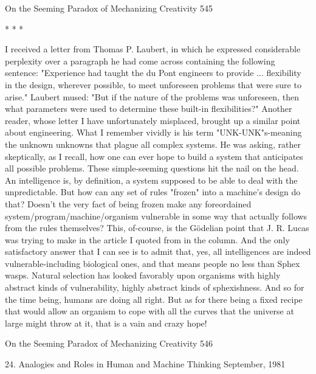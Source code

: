 On the Seeming Paradox of Mechanizing Creativity                                     545

                                       *   *   *

         I received a letter from Thomas P. Laubert, in which he expressed
considerable perplexity over a paragraph he had come across containing the following
sentence: "Experience had taught the du Pont engineers to provide ... flexibility in the
design, wherever possible, to meet unforeseen problems that were sure to arise."
Laubert mused: "But if the nature of the problems was unforeseen, then what
parameters were used to determine these built-in flexibilities?" Another reader, whose
letter I have unfortunately misplaced, brought up a similar point about engineering.
What I remember vividly is his term "UNK-UNK"s-meaning the unknown unknowns
that plague all complex systems. He was asking, rather skeptically, as I recall, how
one can ever hope to build a system that anticipates all possible problems.
         These simple-seeming questions hit the nail on the head. An intelligence is, by
definition, a system supposed to be able to deal with the unpredictable. But how can
any set of rules "frozen" into a machine's design do that? Doesn't the very fact of
being frozen make any foreordained system/program/machine/organism vulnerable in
some way that actually follows from the rules themselves? This, of-course, is the
Gödelian point that J. R. Lucas was trying to make in the article I quoted from in the
column. And the only satisfactory answer that I can see is to admit that, yes, all
intelligences are indeed vulnerable-including biological ones, and that means people
no less than Sphex wasps. Natural selection has looked favorably upon organisms
with highly abstract kinds of vulnerability, highly abstract kinds of sphexishness. And
so for the time being, humans are doing all right. But as for there being a fixed recipe
that would allow an organism to cope with all the curves that the universe at large
might throw at it, that is a vain and crazy hope!




On the Seeming Paradox of Mechanizing Creativity                                    546

                                          24.
                      Analogies and Roles
                in Human and Machine Thinking
                                   September, 1981


